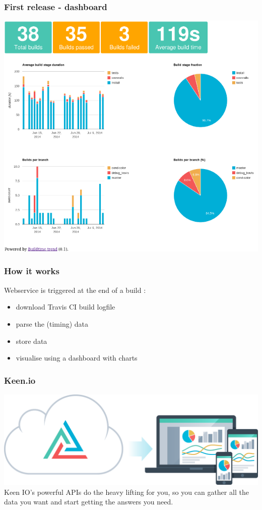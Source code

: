 \documentclass[14pt]{beamer}
\begin{document}
  \begin{frame}
    \frametitle{First release - dashboard}
    \includegraphics[scale=.45]{example_dashboard.png}
  \end{frame}
  \begin{frame}
    \frametitle{How it works}
    Webservice is triggered at the end of a build :
    \begin{itemize}
      \item download Travis CI build logfile
      \item parse the (timing) data
      \item store data
      \item visualise using a dashboard with charts
    \end{itemize}
  \end{frame}
  \begin{frame}
    \frametitle{Keen.io}
    \includegraphics[scale=.20]{keenio_workflow.png}\\
    Keen IO's powerful APIs do the heavy lifting for you, so you can gather all the data you want and start getting the answers you need.
  \end{frame}
\end{document}
